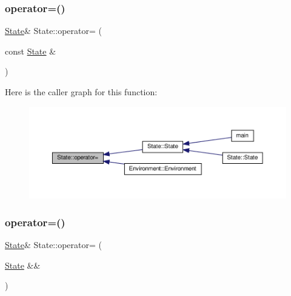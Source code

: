 \mbox{\label{struct_state_a0c83d166ff2b6603a8e11c58d867e76f}} 
\subsubsection{\texorpdfstring{operator=()}{operator=()}\hspace{0.1cm}{\footnotesize\ttfamily [2/4]}}
{\footnotesize\ttfamily \hyperlink{struct_state}{State}\& State\+::operator= (\begin{DoxyParamCaption}\item[{const \hyperlink{struct_state}{State} \&}]{ }\end{DoxyParamCaption})\hspace{0.3cm}{\ttfamily [default]}}

Here is the caller graph for this function\+:
\nopagebreak
\begin{figure}[H]
\begin{center}
\leavevmode
\includegraphics[width=350pt]{struct_state_a0c83d166ff2b6603a8e11c58d867e76f_icgraph}
\end{center}
\end{figure}
\mbox{\label{struct_state_aa8d6ba634492b0c922f7dac1b87873c3}} 
\subsubsection{\texorpdfstring{operator=()}{operator=()}\hspace{0.1cm}{\footnotesize\ttfamily [3/4]}}
{\footnotesize\ttfamily \hyperlink{struct_state}{State}\& State\+::operator= (\begin{DoxyParamCaption}\item[{\hyperlink{struct_state}{State} \&\&}]{ }\end{DoxyParamCaption})\hspace{0.3cm}{\ttfamily [default]}}

